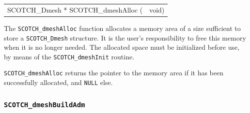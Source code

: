 \begin{itemize}
\progsyn

{\tt\begin{tabular}{l@{}l}
SCOTCH\_Dmesh * SCOTCH\_dmeshAlloc ( & void)
\end{tabular}}

\progdes

The {\tt SCOTCH\_dmeshAlloc} function allocates a memory area of a
size sufficient to store a {\tt SCOTCH\_\lbt Dmesh} structure. It is
the user's responsibility to free this memory when it is no longer
needed. The allocated space must be initialized before use, by means
of the {\tt SCOTCH\_\lbt dmesh\lbt Init} routine.

\progret

{\tt SCOTCH\_dmeshAlloc} returns the pointer to the memory area if it
has been successfully allocated, and {\tt NULL} else.
\end{itemize}

\subsubsection{{\tt SCOTCH\_dmeshBuildAdm}}

